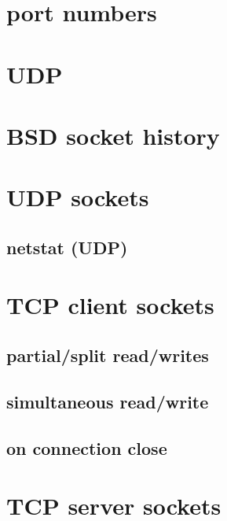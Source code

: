 \section{port numbers}


\section{UDP}


\section{BSD socket history}


\section{UDP sockets}


\subsection{netstat (UDP)}


\section{TCP client sockets}
 

\subsection{partial/split read/writes}



\subsection{simultaneous read/write}


\subsection{on connection close}


\section{TCP server sockets}
